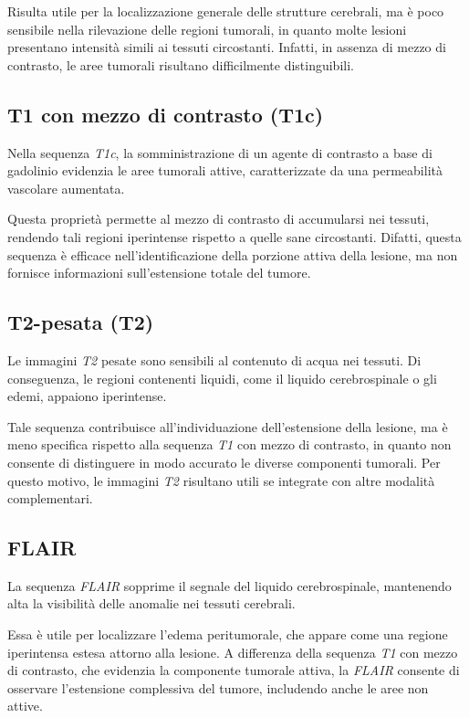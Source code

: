 Risulta utile per la localizzazione generale delle strutture cerebrali, ma è poco sensibile nella rilevazione delle regioni tumorali, in quanto molte lesioni presentano intensità simili ai tessuti circostanti. Infatti, in assenza di mezzo di contrasto, le aree tumorali risultano difficilmente distinguibili.

\subsection{T1 con mezzo di contrasto (T1c)}
Nella sequenza \textit{T1c}, la somministrazione di un agente di contrasto a base di gadolinio evidenzia le aree tumorali attive, caratterizzate da una permeabilità vascolare aumentata.

Questa proprietà permette al mezzo di contrasto di accumularsi nei tessuti, rendendo tali regioni iperintense rispetto a quelle sane circostanti. Difatti, questa sequenza è efficace nell’identificazione della porzione attiva della lesione, ma non fornisce informazioni sull’estensione totale del tumore.

\subsection{T2-pesata (T2)}
Le immagini \textit{T2} pesate sono sensibili al contenuto di acqua nei tessuti. Di conseguenza, le regioni contenenti liquidi, come il liquido cerebrospinale o gli edemi, appaiono iperintense.

Tale sequenza contribuisce all'individuazione dell’estensione della lesione, ma è meno specifica rispetto alla sequenza \textit{T1} con mezzo di contrasto, in quanto non consente di distinguere in modo accurato le diverse componenti tumorali. Per questo motivo, le immagini \textit{T2} risultano utili se integrate con altre modalità complementari.

\subsection{FLAIR}
La sequenza \textit{FLAIR} sopprime il segnale del liquido cerebrospinale, mantenendo alta la visibilità delle anomalie nei tessuti cerebrali.

Essa è utile per localizzare l’edema peritumorale, che appare come una regione iperintensa estesa attorno alla lesione. A differenza della sequenza \textit{T1} con mezzo di contrasto, che evidenzia la componente tumorale attiva, la \textit{FLAIR} consente di osservare l’estensione complessiva del tumore, includendo anche le aree non attive.

